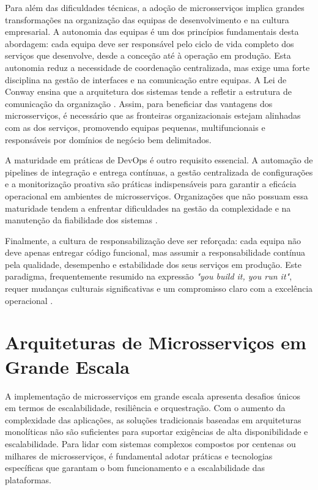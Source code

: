 Para além das dificuldades técnicas, a adoção de microsserviços implica grandes transformações na organização das equipas de desenvolvimento e na cultura empresarial. A autonomia das equipas é um dos princípios fundamentais desta abordagem: cada equipa deve ser responsável pelo ciclo de vida completo dos serviços que desenvolve, desde a conceção até à operação em produção. Esta autonomia reduz a necessidade de coordenação centralizada, mas exige uma forte disciplina na gestão de interfaces e na comunicação entre equipas. A Lei de Conway ensina que a arquitetura dos sistemas tende a refletir a estrutura de comunicação da organização \cite{Bailey2013}. Assim, para beneficiar das vantagens dos microsserviços, é necessário que as fronteiras organizacionais estejam alinhadas com as dos serviços, promovendo equipas pequenas, multifuncionais e responsáveis por domínios de negócio bem delimitados.

A maturidade em práticas de DevOps é outro requisito essencial. A automação de pipelines de integração e entrega contínuas, a gestão centralizada de configurações e a monitorização proativa são práticas indispensáveis para garantir a eficácia operacional em ambientes de microsserviços. Organizações que não possuam essa maturidade tendem a enfrentar dificuldades na gestão da complexidade e na manutenção da fiabilidade dos sistemas \cite{Lewis2014}.

Finalmente, a cultura de responsabilização deve ser reforçada: cada equipa não deve apenas entregar código funcional, mas assumir a responsabilidade contínua pela qualidade, desempenho e estabilidade dos seus serviços em produção. Este paradigma, frequentemente resumido na expressão \textit{"you build it, you run it"}, requer mudanças culturais significativas e um compromisso claro com a excelência operacional \cite{Khan2022}.


\section{Arquiteturas de Microsserviços em Grande Escala}

A implementação de microsserviços em grande escala apresenta desafios únicos em termos de escalabilidade, resiliência e orquestração. Com o aumento da complexidade das aplicações, as soluções tradicionais baseadas em arquiteturas monolíticas não são suficientes para suportar exigências de alta disponibilidade e escalabilidade. Para lidar com sistemas complexos compostos por centenas ou milhares de microsserviços, é fundamental adotar práticas e tecnologias específicas que garantam o bom funcionamento e a escalabilidade das plataformas.

